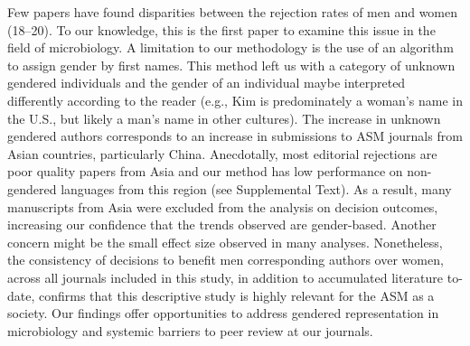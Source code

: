 \documentclass[11pt,]{article}
\begin{document}
Few papers have found disparities between the rejection rates of men and
women (18--20). To our knowledge, this is the first paper to examine
this issue in the field of microbiology. A limitation to our methodology
is the use of an algorithm to assign gender by first names. This method
left us with a category of unknown gendered individuals and the gender
of an individual maybe interpreted differently according to the reader
(e.g., Kim is predominately a woman's name in the U.S., but likely a
man's name in other cultures). The increase in unknown gendered authors
corresponds to an increase in submissions to ASM journals from Asian
countries, particularly China. Anecdotally, most editorial rejections
are poor quality papers from Asia and our method has low performance on
non-gendered languages from this region (see Supplemental Text). As a
result, many manuscripts from Asia were excluded from the analysis on
decision outcomes, increasing our confidence that the trends observed
are gender-based. Another concern might be the small effect size
observed in many analyses. Nonetheless, the consistency of decisions to
benefit men corresponding authors over women, across all journals
included in this study, in addition to accumulated literature to-date,
confirms that this descriptive study is highly relevant for the ASM as a
society. Our findings offer opportunities to address gendered
representation in microbiology and systemic barriers to peer review at
our journals.
\end{document}

